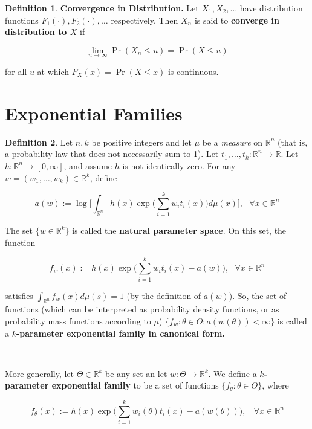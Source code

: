 \documentclass{article}
\theoremstyle{definition}
\theoremstyle{definition}
\theoremstyle{definition}
\theoremstyle{definition}
\theoremstyle{definition}
\newtheorem{definition}{Definition}[section]
\theoremstyle{definition}
\theoremstyle{definition}
\begin{document}
\begin{definition}
\textbf{Convergence in Distribution.} Let \(X_1, X_2, \ldots\) have distribution functions \(F_1(\cdot), F_2(\cdot), \ldots \) respectively. Then \(X_n\) is said to \textbf{converge in distribution to \(X\)} if

\[
\lim_{n \to \infty} \Pr(X_n \leq u) = \Pr(X \leq u)
\]

for all \(u\) at which \(F_X(x) = \Pr(X \leq x)\) is continuous. 


\end{definition}



\section{Exponential Families}

\begin{definition}\label{prob.defn.exp.fams} Let \(n, k\) be positive integers and let \(\mu\) be a \textit{measure} on \(\mathbb{R}^n\) (that is, a probability law that does not necessarily sum to 1). Let \(t_1, \ldots, t_k : \mathbb{R}^n \to \mathbb{R}\). Let \(h: \mathbb{R}^n \to [0, \infty]\), and assume \(h\) is not identically zero. For any \(w = (w_1, \ldots, w_k) \in \mathbb{R}^k\), define

\[
a(w) := \log \bigg[ \int_{\mathbb{R}^n} h(x) \exp \bigg( \sum_{i=1}^k w_i t_i(x) \bigg) d \mu(x) \bigg], \ \ \ \forall x \in \mathbb{R}^n
\]

The set \(\{w \in \mathbb{R}^k\}\) is called the \textbf{natural parameter space}. On this set, the function

\[
f_w(x) := h(x) \exp \bigg( \sum_{i=1}^k w_i t_i(x) - a(w) \bigg), \ \ \ \forall x \in \mathbb{R}^n
\]

satisfies \(\int_{\mathbb{R}^n} f_w(x) d \mu(s) = 1\) (by the definition of \(a(w)\)). So, the set of functions (which can be interpreted as probability density functions, or as probability mass functions according to \(\mu\)) \(\{f_w: \theta \in \Theta: a(w(\theta)) < \infty \}\) is called a \textbf{\(k\)-parameter exponential family in canonical form.} 
 
 \
 
 More generally, let \(\Theta \in \mathbb{R}^k\) be any set an let \(w: \Theta \to \mathbb{R}^k\). We define a \textbf{\(k\)-parameter exponential family} to be a set of functions \(\{f_{\theta}: \theta \in \Theta\}\), where
 
 \[
 f_{\theta}(x) := h(x) \exp \bigg( \sum_{i=1}^k w_i(\theta) t_i(x) - a(w(\theta))\bigg), \ \ \ \ \forall x \in \mathbb{R}^n
 \]
 

\end{definition}
\end{document}
